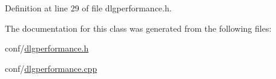 Definition at line 29 of file dlgperformance.\+h.



The documentation for this class was generated from the following files\+:\begin{DoxyCompactItemize}
\item 
conf/\hyperlink{dlgperformance_8h}{dlgperformance.\+h}\item 
conf/\hyperlink{dlgperformance_8cpp}{dlgperformance.\+cpp}\end{DoxyCompactItemize}

